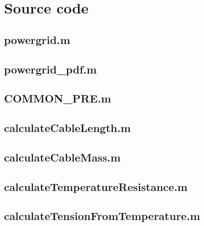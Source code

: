 \documentclass[a4paper]{article}
\begin{document}
\section{Source code}
\begin{appendices}
\subsection{powergrid.m}

\subsection{powergrid\_pdf.m}

\subsection{COMMON\_PRE.m}

\subsection{calculateCableLength.m}

\subsection{calculateCableMass.m}

\subsection{calculateTemperatureResistance.m}

\subsection{calculateTensionFromTemperature.m}


\end{appendices}
\end{document}
